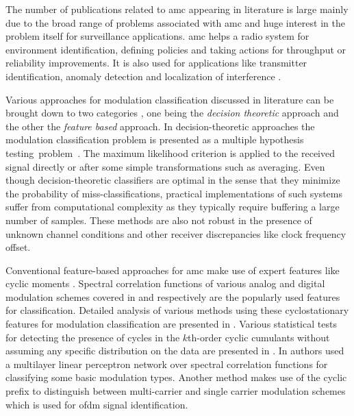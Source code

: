 The number of publications related to \ac{amc} appearing in literature is large \cite{txminer,dof,litsurvey,gardner_unif,zaihe_thesis,cyclo_test} mainly due to the broad range of problems associated with \ac{amc} and huge interest in the problem itself for surveillance applications. \ac{amc} helps a radio system for environment identification, defining policies and taking actions for throughput or reliability improvements. It is also used for applications like transmitter identification, anomaly detection and localization of interference \cite{txminer,dof}. 

Various approaches for modulation classification discussed in literature can be brought down to two categories \cite{litsurvey}, one being the \emph{decision theoretic} approach and the other the \emph{feature based} approach. In decision-theoretic approaches the modulation classification problem is presented as a multiple hypothesis \mbox{testing problem \cite{litsurvey}}. %
The maximum likelihood criterion is applied to the received signal directly or after some simple transformations such as averaging. Even though decision-theoretic classifiers are optimal in the sense that they minimize the probability of miss-classifications, practical implementations of such systems suffer from computational complexity as they typically require buffering a large number of samples. These methods are also not robust in the presence of unknown channel conditions and other receiver discrepancies like clock frequency offset. 

Conventional feature-based approaches for \ac{amc} make use of expert features like cyclic moments \cite{gardner_unif}. Spectral correlation functions of various analog and digital modulation schemes covered in \cite{scf_analog} and \cite{scf_digital} respectively are the popularly used features for classification. Detailed analysis of various methods using these cyclostationary features for modulation classification are presented in \cite{zaihe_thesis}. Various statistical tests for detecting the presence of cycles in the $k$th-order cyclic cumulants without assuming any specific distribution on the data are presented in \cite{cyclo_test}. In \cite{scf_nn} authors used a multilayer linear perceptron network over spectral correlation functions for classifying some basic modulation types. Another method makes use of the cyclic prefix \cite{ofdm_classif} to distinguish between multi-carrier and single carrier modulation schemes which is used for \ac{ofdm} signal identification. 


